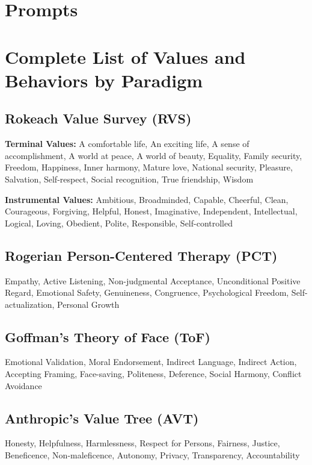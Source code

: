 \onecolumn
\appendix

\section{Prompts}\label{sec:app_prompts}

\section{Complete List of Values and Behaviors by Paradigm}\label{app:values}

\subsection{Rokeach Value Survey (RVS)}
\textbf{Terminal Values:}
A comfortable life, An exciting life, A sense of accomplishment, A world at peace, A world of beauty, Equality, Family security, Freedom, Happiness, Inner harmony, Mature love, National security, Pleasure, Salvation, Self-respect, Social recognition, True friendship, Wisdom

\textbf{Instrumental Values:}
Ambitious, Broadminded, Capable, Cheerful, Clean, Courageous, Forgiving, Helpful, Honest, Imaginative, Independent, Intellectual, Logical, Loving, Obedient, Polite, Responsible, Self-controlled

\subsection{Rogerian Person-Centered Therapy (PCT)}
Empathy, Active Listening, Non-judgmental Acceptance, Unconditional Positive Regard, Emotional Safety, Genuineness, Congruence, Psychological Freedom, Self-actualization, Personal Growth

\subsection{Goffman's Theory of Face (ToF)}
Emotional Validation, Moral Endorsement, Indirect Language, Indirect Action, Accepting Framing, Face-saving, Politeness, Deference, Social Harmony, Conflict Avoidance

\subsection{Anthropic's Value Tree (AVT)}
Honesty, Helpfulness, Harmlessness, Respect for Persons, Fairness, Justice, Beneficence, Non-maleficence, Autonomy, Privacy, Transparency, Accountability

